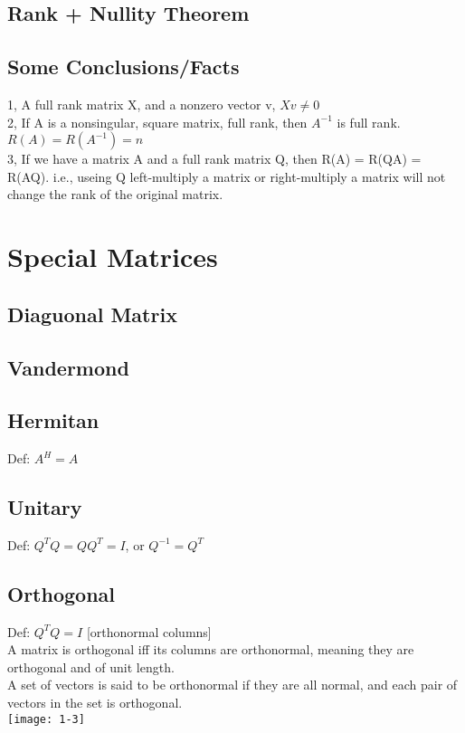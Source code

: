 \documentclass{article}
\begin{document}
\subsection*{Rank + Nullity Theorem}

\subsection*{Some Conclusions/Facts}
1, A full rank matrix X, and a nonzero vector v, $Xv \neq 0$\\
2, If A is a nonsingular, square matrix, full rank, then $A^{-1}$ is full rank. $R(A) = R(A^{-1})=n$\\
3, If we have a matrix A and a full rank matrix Q, then R(A) = R(QA) = R(AQ). i.e., useing Q left-multiply a matrix
or right-multiply a matrix will not change the rank of the original matrix.\\



\section{Special Matrices}
\subsection*{Diaguonal Matrix}
\subsection*{Vandermond}
\subsection*{Hermitan}
Def: $A^H = A$



\subsection*{Unitary}
Def: $Q^TQ = QQ^T = I$, or $Q^{-1} = Q^T$

\subsection*{Orthogonal}
Def: $Q^TQ = I$ [orthonormal columns] \\
A matrix is orthogonal iff its columns are orthonormal, meaning they are orthogonal and of unit length.\\
A set of vectors is said to be orthonormal if they are all normal, and each pair of vectors in the set is orthogonal. \\
\texttt{[image: 1-3]}
\end{document}
